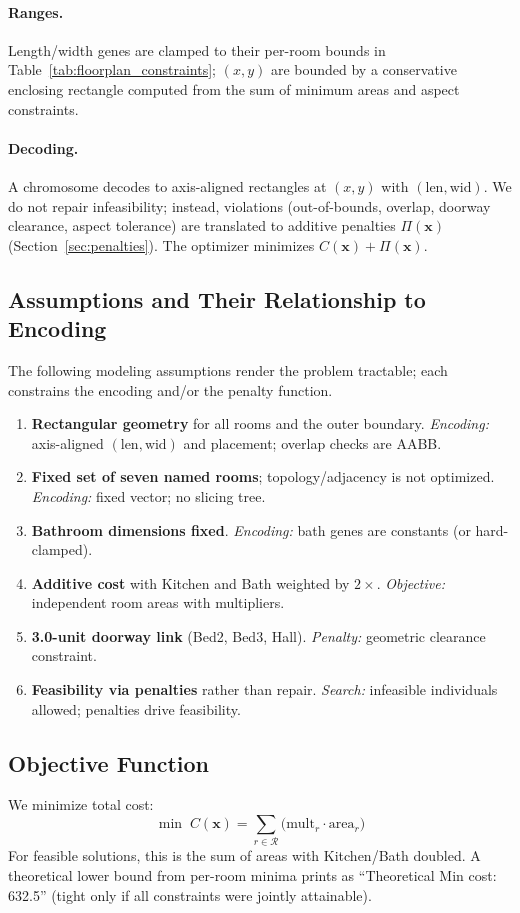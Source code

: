 \documentclass{article}
\begin{document}
\paragraph{Ranges.}
Length/width genes are clamped to their per-room bounds in Table~\ref{tab:floorplan_constraints}; $(x,y)$ are bounded by a conservative enclosing rectangle computed from the sum of minimum areas and aspect constraints.

\paragraph{Decoding.}
A chromosome decodes to axis-aligned rectangles at $(x,y)$ with $(\text{len},\text{wid})$. We do not repair infeasibility; instead, violations (out-of-bounds, overlap, doorway clearance, aspect tolerance) are translated to additive penalties $\Pi(\mathbf{x})$ (Section~\ref{sec:penalties}). The optimizer minimizes $C(\mathbf{x})+\Pi(\mathbf{x})$.

\subsection{Assumptions and Their Relationship to Encoding}
The following modeling assumptions render the problem tractable; each constrains the encoding and/or the penalty function.
\begin{enumerate}
    \item \textbf{Rectangular geometry} for all rooms and the outer boundary. \emph{Encoding:} axis-aligned $(\text{len},\text{wid})$ and placement; overlap checks are AABB.
    \item \textbf{Fixed set of seven named rooms}; topology/adjacency is not optimized. \emph{Encoding:} fixed vector; no slicing tree.
    \item \textbf{Bathroom dimensions fixed}. \emph{Encoding:} bath genes are constants (or hard-clamped).
    \item \textbf{Additive cost} with Kitchen and Bath weighted by $2\times$. \emph{Objective:} independent room areas with multipliers.
    \item \textbf{3.0-unit doorway link} (Bed2, Bed3, Hall). \emph{Penalty:} geometric clearance constraint.
    \item \textbf{Feasibility via penalties} rather than repair. \emph{Search:} infeasible individuals allowed; penalties drive feasibility.
\end{enumerate}

\subsection{Objective Function}
We minimize total cost:
\[
\min\; C(\mathbf{x})=\sum_{r \in \mathcal{R}} \big(\text{mult}_r \cdot \text{area}_r \big)
\]
For feasible solutions, this is the sum of areas with Kitchen/Bath doubled. A theoretical lower bound from per-room minima prints as ``Theoretical Min cost: 632.5'' (tight only if all constraints were jointly attainable).
\end{document}
